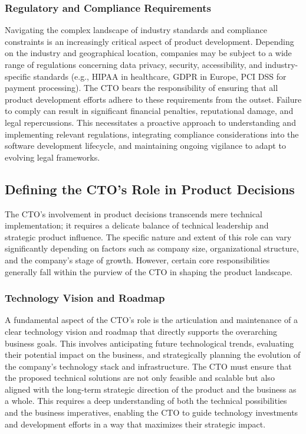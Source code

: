\subsubsection{Regulatory and Compliance Requirements}
Navigating the complex landscape of industry standards and compliance constraints is an increasingly critical aspect of product development. Depending on the industry and geographical location, companies may be subject to a wide range of regulations concerning data privacy, security, accessibility, and industry-specific standards (e.g., HIPAA in healthcare, GDPR in Europe, PCI DSS for payment processing). The \gls{CTO} bears the responsibility of ensuring that all product development efforts adhere to these requirements from the outset. Failure to comply can result in significant financial penalties, reputational damage, and legal repercussions. This necessitates a proactive approach to understanding and implementing relevant regulations, integrating compliance considerations into the software development lifecycle, and maintaining ongoing vigilance to adapt to evolving legal frameworks.

\subsection{Defining the CTO's Role in Product Decisions}
The \gls{CTO}'s involvement in product decisions transcends mere technical implementation; it requires a delicate balance of technical leadership and strategic product influence. The specific nature and extent of this role can vary significantly depending on factors such as company size, organizational structure, and the company's stage of growth. However, certain core responsibilities generally fall within the purview of the \gls{CTO} in shaping the product landscape.

\subsubsection{Technology Vision and Roadmap}
A fundamental aspect of the \gls{CTO}'s role is the articulation and maintenance of a clear technology vision and roadmap that directly supports the overarching business goals. This involves anticipating future technological trends, evaluating their potential impact on the business, and strategically planning the evolution of the company's technology stack and infrastructure. The \gls{CTO} must ensure that the proposed technical solutions are not only feasible and scalable but also aligned with the long-term strategic direction of the product and the business as a whole. This requires a deep understanding of both the technical possibilities and the business imperatives, enabling the \gls{CTO} to guide technology investments and development efforts in a way that maximizes their strategic impact.


